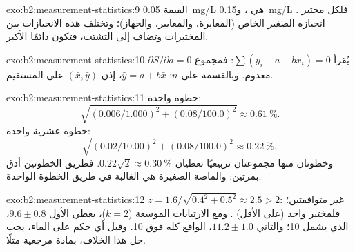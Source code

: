 \begin{solution}{exo:b2:measurement-statistics:9}
القيمة \qty{0.05}{mg/L} هي ، و\qty{0.15}{mg/L} . فلكل مختبر
انحيازه الصغير الخاص (المعايرة، والمعايير، والجهاز)؛ وتختلف هذه الانحيازات بين المختبرات وتضاف
إلى التشتت، فتكون  دائمًا الأكبر.
\end{solution}

\begin{solution}{exo:b2:measurement-statistics:10}
$\partial S/\partial a = 0$ يُقرأ $\sum(y_i - a - bx_i) = 0$: فمجموع  معدوم. وبالقسمة على
$n$: $\bar y = a + b\bar x$، إذن $(\bar x, \bar y)$ على المستقيم.
\end{solution}

\begin{solution}{exo:b2:measurement-statistics:11}
خطوة واحدة:
\[\sqrt{(0.006/1.000)^2 + (0.08/100.0)^2} \approx 0.61~\%.\]
خطوة عشرية واحدة:
\[\sqrt{(0.02/10.00)^2 + (0.08/100.0)^2} \approx 0.22~\%,\]
وخطوتان منها مجموعتان تربيعيًا تعطيان $0.22\sqrt2 \approx 0.30~\%$. فطريق الخطوتين أدق بمرتين: والماصة الصغيرة هي الغالبة في
طريق الخطوة الواحدة.
\end{solution}

\begin{solution}{exo:b2:measurement-statistics:12}
$z = 1.6/\sqrt{0.4^2 + 0.5^2} \approx 2.5 > 2$: غير متوافقتين؛ فلمختبر واحد (على الأقل) .
ومع الارتيابات الموسعة ($k = 2$)، يعطي الأول $9.6 \pm 0.8$، الذي يشمل 10؛ والثاني
$11.2 \pm 1.0$، الواقع كله فوق 10. وقبل أي حكم على الماء، يجب حل هذا الخلاف،
بمادة مرجعية مثلًا.
\end{solution}

